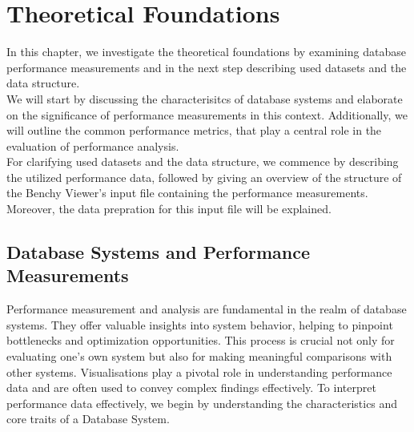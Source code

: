
\chapter{Theoretical Foundations}\label{chapter:theoreticalFoundacions}

In this chapter, we investigate the theoretical foundations by examining database performance measurements and in the next step describing used datasets and the data structure.\\We will start by discussing the characterisitcs of database systems and elaborate on the significance of performance measurements in this context. Additionally, we will outline the common performance metrics, that play a central role in the evaluation of performance analysis.
\\ For clarifying used datasets and the data structure, we commence by describing the utilized performance data, followed by giving an overview of the structure of the Benchy Viewer's input file containing the performance measurements. Moreover, the data prepration for this input file will be explained.

\section{Database Systems and Performance Measurements}
Performance measurement and analysis are fundamental in the realm of database systems. They offer valuable insights into system behavior, helping to pinpoint bottlenecks and optimization opportunities. This process is crucial not only for evaluating one's own system but also for making meaningful comparisons with other systems. Visualisations play a pivotal role in understanding performance data and are often used to convey complex findings effectively.
To interpret performance data effectively, we begin by understanding the characteristics and core traits of a Database System.

